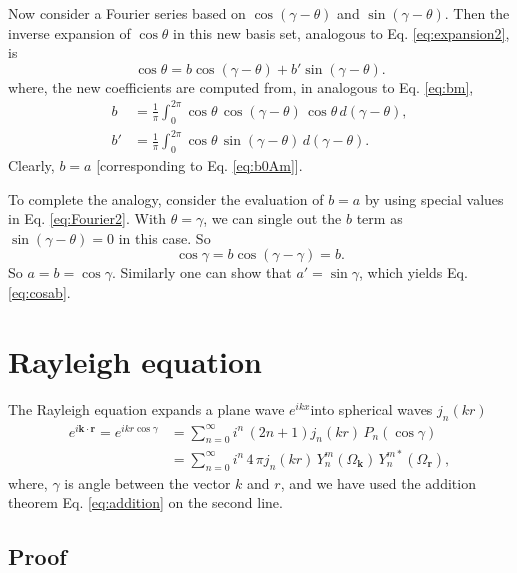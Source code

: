\documentclass[11pt]{article}
\newcommand{\vct}[1]{\boldsymbol{\mathbf{#1}}}
\newcommand{\vr}{\vct{r}}
\newcommand{\vk}{\vct{k}}
\begin{document}
Now consider a Fourier series based on $\cos(\gamma - \theta)$
and $\sin(\gamma - \theta)$.
Then the inverse expansion of $\cos\theta$
in this new basis set, analogous to Eq. \eqref{eq:expansion2}, is
\begin{equation}
  \cos\theta
  =
  b \cos(\gamma - \theta)
+
  b' \sin(\gamma - \theta).
  \label{eq:Fourier2}
\end{equation}
where,
the new coefficients are computed from,
in analogous to Eq. \eqref{eq:bm},
\begin{align}
b &= \frac{1}{\pi} \int_0^{2\pi}
  \cos\theta \, \cos(\gamma - \theta) \, \cos\theta \, d(\gamma - \theta),
  \label{eq:c2}
\\
b' &= \frac{1}{\pi} \int_0^{2\pi}
  \cos\theta \, \sin(\gamma - \theta) \, d(\gamma - \theta).
  \label{eq:s2}
\end{align}
Clearly, $b = a$ [corresponding to Eq. \eqref{eq:b0Am}].

To complete the analogy,
consider the evaluation of $b = a$
by using special values in
Eq. \eqref{eq:Fourier2}.
%
With $\theta = \gamma$,
we can single out the $b$ term
as $\sin(\gamma - \theta) = 0$
in this case.
%
So
\begin{equation}
  \cos\gamma
=
  b \cos(\gamma - \gamma)
= b.
\end{equation}
So $a = b = \cos\gamma$.
%
Similarly one can show that $a' = \sin\gamma$,
which yields Eq. \eqref{eq:cosab}.



\section{Rayleigh equation}



The Rayleigh equation expands a plane wave $e^{i k x}$into spherical waves $j_n(kr)$
\begin{align}
  e^{i\vk \cdot \vr}
=
  e^{ikr\cos\gamma}
&=
  \sum_{n = 0}^\infty
i^n \, ( 2 n + 1 )
j_n(k r) \, P_n(\cos\gamma)
\label{eq:rayleigh} \\
&=
  \sum_{n = 0}^\infty
i^n \, 4 \, \pi
j_n(k r) \, Y_n^m(\Omega_{\vk}) \, Y_n^{m*}(\Omega_{\vr}),
\label{eq:rayleigh_yy}
\end{align}
where, $\gamma$ is angle between the vector $k$ and $r$,
and we have used the addition theorem Eq. \eqref{eq:addition}
on the second line.



\subsection{Proof}
\end{document}
